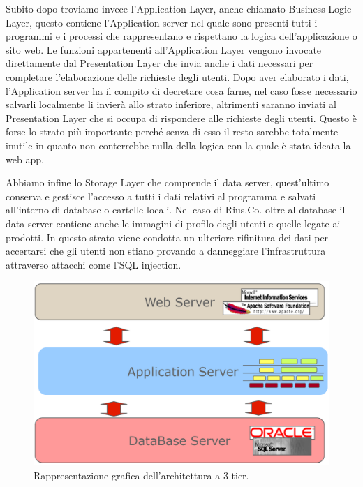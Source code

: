 Subito dopo troviamo invece l'Application Layer, anche chiamato Business Logic Layer, questo contiene l'Application server nel quale sono presenti tutti i programmi e i processi che rappresentano e rispettano la logica dell'applicazione o sito web. Le funzioni appartenenti all'Application Layer vengono invocate direttamente dal Presentation Layer che invia anche i dati necessari per completare l'elaborazione delle richieste degli utenti. Dopo aver elaborato i dati, l'Application server ha il compito di decretare cosa farne, nel caso fosse necessario salvarli localmente li invierà allo strato inferiore, altrimenti saranno inviati al Presentation Layer che si occupa di rispondere alle richieste degli utenti. Questo è forse lo strato più importante perché senza di esso il resto sarebbe totalmente inutile in quanto non conterrebbe nulla della logica con la quale è stata ideata la web app. 
\medskip

Abbiamo infine lo Storage Layer che comprende il data server, quest'ultimo conserva e gestisce l'accesso a tutti i dati relativi al programma e salvati all'interno di database o cartelle locali. Nel caso di Rius.Co. oltre al database il data server contiene anche le immagini di profilo degli utenti e quelle legate ai prodotti. In questo strato viene condotta un ulteriore rifinitura dei dati per accertarsi che gli utenti non stiano provando a danneggiare l'infrastruttura attraverso attacchi come l'SQL injection. 

\begin{figure}[ht]
    \centering\includegraphics[scale=0.24]{images/3tier.png}
    \caption{Rappresentazione grafica dell'architettura a 3 tier.}
\end{figure}

